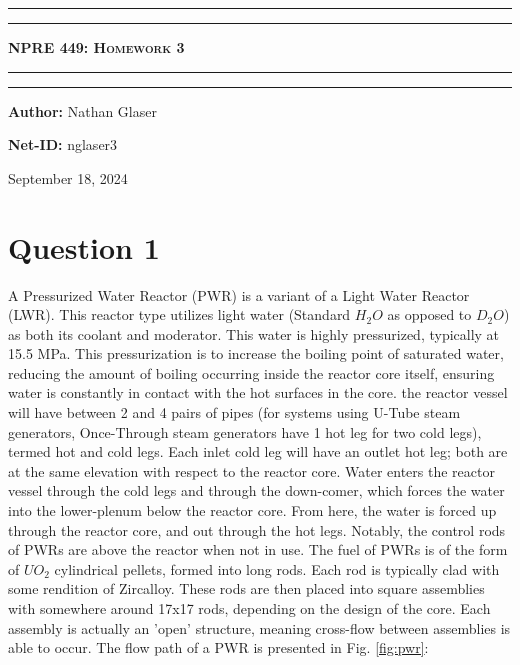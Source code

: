 \documentclass{article}
\begin{document}
\begin{titlepage}

\centering
\scshape
\vspace{\baselineskip}

%
\rule{\textwidth}{1.6pt}\vspace*{-\baselineskip}\vspace*{2pt}
\rule{\textwidth}{0.4pt}

{\Huge \textbf{\textsc{NPRE 449: Homework 3 \\
\vspace{15pt}}}}

\rule{\textwidth}{0.4pt}\vspace*{-\baselineskip}\vspace{3.2pt}
\rule{\textwidth}{1.6pt}\vspace{6pt}
\vspace{1.5\baselineskip}


\large \centerline{\textbf{Author:} Nathan Glaser}
\large \centerline{\textbf{Net-ID:} nglaser3}
\quad

\vfill
\large \centerline{September 18, 2024}
%
\end{titlepage}

\tableofcontents
\newpage
{}

\section*{Question 1}

A Pressurized Water Reactor (PWR) is a variant of a Light Water Reactor (LWR). This reactor type utilizes light water (Standard $H_2O$ as opposed to $D_2O$) as both its coolant and moderator. This water is highly pressurized, typically at 15.5 MPa. This pressurization is to increase the boiling point of saturated water, reducing the amount of boiling occurring inside the reactor core itself, ensuring water is constantly in contact with the hot surfaces in the core. the reactor vessel will have between 2 and 4 pairs of pipes (for systems using U-Tube steam generators, Once-Through steam generators have 1 hot leg for two cold legs), termed hot and cold legs. Each inlet cold leg will have an outlet hot leg; both are at the same elevation with respect to the reactor core. Water enters the reactor vessel through the cold legs and through the down-comer, which forces the water into the lower-plenum below the reactor core. From here, the water is forced up through the reactor core, and out through the hot legs. Notably, the control rods of PWRs are above the reactor when not in use. The fuel of PWRs is of the form of $UO_2$ cylindrical pellets, formed into long rods. Each rod is typically clad with some rendition of Zircalloy. These rods are then placed into square assemblies with somewhere around 17x17 rods, depending on the design of the core. Each assembly is actually an 'open' structure, meaning cross-flow between assemblies is able to occur. The flow path of a PWR is presented in Fig. \ref{fig:pwr}:
\end{document}

